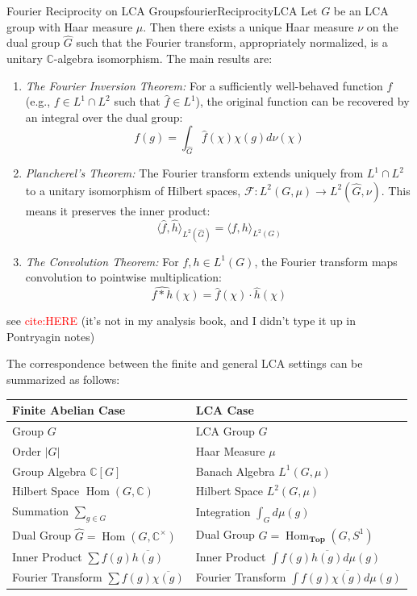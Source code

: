 \documentclass{article}
\newcommand{\C}{{\mathbb{C}}}
\newcommand{\Top}{{\textbf{Top}}}
\newcommand{\Hom}{{\operatorname{Hom}}}
\begin{document}
\begin{thm}{Fourier Reciprocity on LCA Groups}{fourierReciprocityLCA}
	Let $G$ be an LCA group with Haar measure $\mu$. Then there exists a unique Haar measure $\nu$ on the dual group $\widehat{G}$ such that the Fourier transform, appropriately normalized, is a unitary $\C$-algebra isomorphism. The main results are:
	\begin{enumerate}
		\item \emph{The Fourier Inversion Theorem:} For a sufficiently well-behaved function $f$ (e.g., $f \in L^1 \cap L^2$ such that $\hat{f} \in L^1$), the original function can be recovered by an integral over the dual group:
		\[
			f(g) = \int_{\widehat{G}} \hat{f}(\chi) \chi(g) d\nu(\chi)
		\]
		\item \emph{Plancherel's Theorem:} The Fourier transform extends uniquely from $L^1 \cap L^2$ to a unitary isomorphism of Hilbert spaces, $\mathcal{F}: L^2(G, \mu) \to L^2(\widehat{G}, \nu)$. This means it preserves the inner product:
		\[
			\langle \hat{f}, \hat{h} \rangle_{L^2(\widehat{G})} = \langle f, h \rangle_{L^2(G)}
		\]
		\item \emph{The Convolution Theorem:} For $f, h \in L^1(G)$, the Fourier transform maps convolution to pointwise multiplication:
		\[
			\widehat{f * h}(\chi) = \hat{f}(\chi) \cdot \hat{h}(\chi)
		\]
	\end{enumerate}
\end{thm}

\begin{Proof}
	see \textcolor{red}{cite:HERE} (it's not in my analysis book, and I didn't type it up in Pontryagin notes)
\end{Proof}

The correspondence between the finite and general LCA settings can be summarized as follows:

\begin{center}
\begin{tabular}{l|l}
	\textbf{Finite Abelian Case} & \textbf{LCA Case} \\
	\hline
	Group $G$ & LCA Group $G$ \\
	Order $|G|$ & Haar Measure $\mu$ \\
	Group Algebra $\C[G]$ & Banach Algebra $L^1(G, \mu)$ \\
	Hilbert Space $\Hom(G, \C)$ & Hilbert Space $L^2(G, \mu)$ \\
	Summation $\sum_{g \in G}$ & Integration $\int_G d\mu(g)$ \\
	Dual Group $\widehat{G} = \Hom(G, \C^\times)$ & Dual Group $\widehat{G} = \Hom_\Top(G, S^1)$ \\
	Inner Product $\sum f(g)\overline{h(g)}$ & Inner Product $\int f(g)\overline{h(g)}d\mu(g)$ \\
	Fourier Transform $\sum f(g)\overline{\chi(g)}$ & Fourier Transform $\int f(g)\overline{\chi(g)}d\mu(g)$
\end{tabular}
\end{center}
\end{document}
